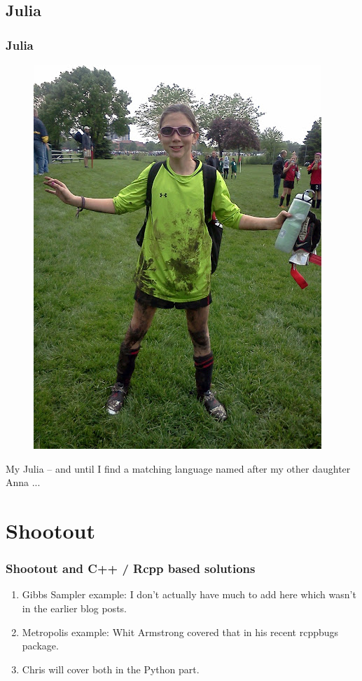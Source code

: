 \documentclass[dvipsnames,handout,compress,pdflatex,beamer]{beamer}
\begin{document}
\subsection{Julia}
\begin{frame}
  \frametitle{Julia}
  \pause

  \begin{figure}
    \includegraphics[scale=0.3]{images/JEasGoalie.jpeg}
  \end{figure}

  \medskip

  My Julia -- and until I find a matching language named after my other
  daughter Anna ...

\end{frame}
\fi

\section{Shootout}
\begin{frame}
  \frametitle{Shootout and C++ / Rcpp based solutions}

  \begin{enumerate}[<+->]
  \item Gibbs Sampler example:  I don't actually have much to add here which
    wasn't in the earlier blog posts.
  \item Metropolis example:  Whit Armstrong covered that in his recent
    rcppbugs package.
  \item Chris will cover both in the Python part.
  \end{enumerate}
\end{frame}
\end{document}
